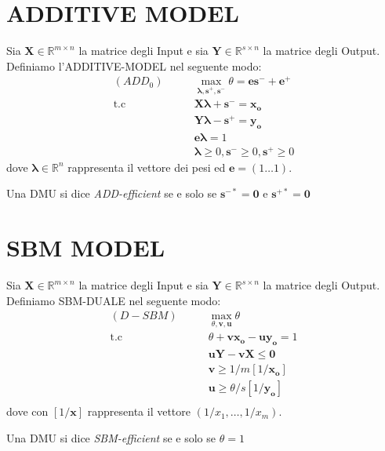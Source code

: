 \section{ADDITIVE MODEL}
\bigskip
\begin{definiz}
Sia $\boldsymbol{X} \in \mathbb{R}^{m \times n}$ la matrice degli Input e sia $\boldsymbol{Y} \in \mathbb{R}^{s \times n}$  la matrice degli Output. Definiamo l'ADDITIVE-MODEL nel seguente modo:
\begin{equation}
\begin{split}
(ADD_0) \qquad & \max_{\boldsymbol{\lambda, s^+, s^-}} \theta = \boldsymbol{es^- + e^+}\\
\text{t.c} \qquad & \boldsymbol{X\lambda + s^-} =  \boldsymbol{x_o} \\
& \boldsymbol{Y\lambda - s^+} = \boldsymbol{y_o} \\
& \boldsymbol{e\lambda} = 1 \\
& \boldsymbol{\lambda} \geq 0 , \boldsymbol{s^-} \geq 0 ,\boldsymbol{s^+} \geq 0 
\end{split}
\end{equation}
dove $\boldsymbol{\lambda} \in \mathbb{R}^{n}$ rappresenta il vettore dei pesi ed $\boldsymbol{e} = (1 \dots 1)$.
\end{definiz}
\begin{definiz}
Una DMU si dice \emph{ADD-efficient} se e solo se $\boldsymbol{s^{-*} = 0}$ e $\boldsymbol{s^{+*} = 0}$
\end{definiz}
\section{SBM MODEL}
\bigskip
\begin{definiz}
Sia $\boldsymbol{X} \in \mathbb{R}^{m \times n}$ la matrice degli Input e sia $\boldsymbol{Y} \in \mathbb{R}^{s \times n}$  la matrice degli Output. Definiamo SBM-DUALE nel seguente modo:
\begin{equation}
\begin{split}
(D-SBM) \qquad & \max_{\theta, \boldsymbol{v, u}} \theta \\
\text{t.c} \qquad & \theta + \boldsymbol{vx_o - uy_o} =  1 \\
& \boldsymbol{uY - vX} \leq \boldsymbol{0} \\
& \boldsymbol{v} \geq 1/m[1/\boldsymbol{x_o}] \\
& \boldsymbol{u} \geq \theta/s[1/\boldsymbol{y_o}] \\
\end{split}
\end{equation}
dove con $[1/\boldsymbol{x}]$ rappresenta il vettore $(1/x_1, \dots , 1/x_m)$.
\end{definiz}
\begin{definiz}
Una DMU si dice \emph{SBM-efficient} se e solo se $\theta = 1$
\end{definiz}
